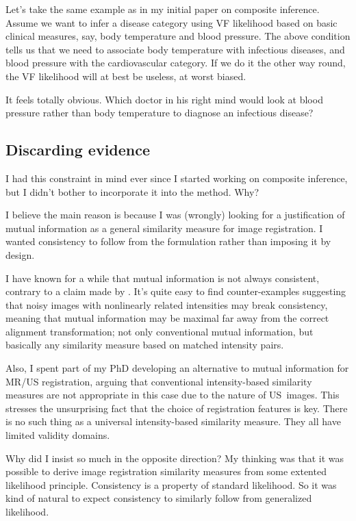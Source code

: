 \documentclass[english]{scrartcl}
\begin{document}
Let's take the same example as in my initial paper on composite inference. Assume we want to infer a disease category using VF likelihood based on basic clinical measures, say, body temperature and blood pressure. The above condition tells us that we need to associate body temperature with infectious diseases, and blood pressure with the cardiovascular category. If we do it the other way round, the VF likelihood will at best be useless, at worst biased.

It feels totally obvious. Which doctor in his right mind would look at blood pressure rather than body temperature to diagnose an infectious disease? 


\subsection{Discarding evidence}

I had this constraint in mind ever since I started working on composite inference, but I didn't bother to incorporate it into the method. Why?

I believe the main reason is because I was (wrongly) looking for a justification of mutual information as a general similarity measure for image registration. I wanted consistency to follow from the formulation rather than imposing it by design.

I have known for a while that mutual information is not always consistent, contrary to a claim made by \cite{Zollei-09}. It's quite easy to find counter-examples suggesting that noisy images with nonlinearly related intensities may break consistency, meaning that mutual information may be maximal far away from the correct alignment transformation; not only conventional mutual information, but basically any similarity measure based on matched intensity pairs.

Also, I spent part of my PhD developing an alternative to mutual information for MR/US registration, arguing that conventional intensity-based similarity measures are not appropriate in this case due to the nature of US~images. This stresses the unsurprising fact that the choice of registration features is key. There is no such thing as a universal intensity-based similarity measure. They all have limited validity domains.

Why did I insist so much in the opposite direction? My thinking was that it was possible to derive image registration similarity measures from some extented likelihood principle. Consistency is a property of standard likelihood. So it was kind of natural to expect consistency to similarly follow from generalized likelihood.
\end{document}
